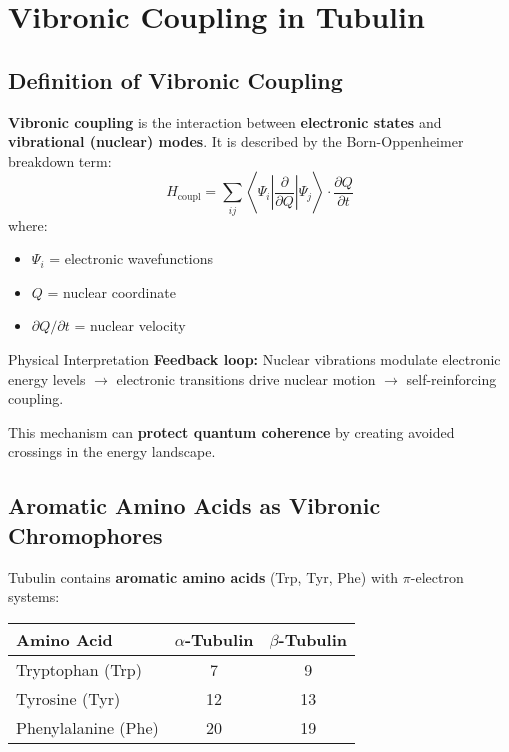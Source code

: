 \section{Vibronic Coupling in Tubulin}

\subsection{Definition of Vibronic Coupling}

\textbf{Vibronic coupling} is the interaction between \textbf{electronic states} and \textbf{vibrational (nuclear) modes}. It is described by the Born-Oppenheimer breakdown term:
\begin{equation}
H_{\text{coupl}} = \sum_{ij} \left\langle \Psi_i \left| \frac{\partial}{\partial Q} \right| \Psi_j \right\rangle \cdot \frac{\partial Q}{\partial t}
\label{eq:vibronic-coupling}
\end{equation}
where:
\begin{itemize}
\item $\Psi_i$ = electronic wavefunctions
\item $Q$ = nuclear coordinate
\item $\partial Q/\partial t$ = nuclear velocity
\end{itemize}

\begin{calloutbox}{Physical Interpretation}
\textbf{Feedback loop:} Nuclear vibrations modulate electronic energy levels $\rightarrow$ electronic transitions drive nuclear motion $\rightarrow$ self-reinforcing coupling.

This mechanism can \textbf{protect quantum coherence} by creating avoided crossings in the energy landscape.
\end{calloutbox}

\subsection{Aromatic Amino Acids as Vibronic Chromophores}

Tubulin contains \textbf{aromatic amino acids} (Trp, Tyr, Phe) with $\pi$-electron systems:

\begin{center}
\begin{tabular}{@{}lcc@{}}
\toprule
\textbf{Amino Acid} & \textbf{$\alpha$-Tubulin} & \textbf{$\beta$-Tubulin} \\
\midrule
Tryptophan (Trp) & 7 & 9 \\
Tyrosine (Tyr) & 12 & 13 \\
Phenylalanine (Phe) & 20 & 19 \\
\bottomrule
\end{tabular}
\end{center}

